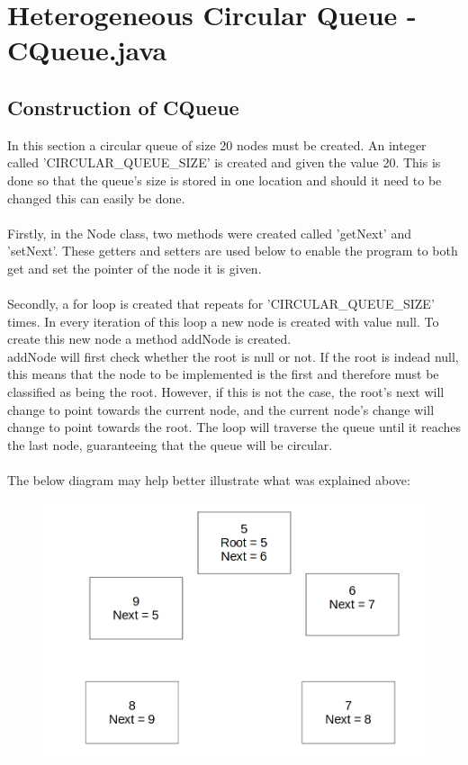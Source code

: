 \documentclass[a4paper]{article}
\begin{document}
\section{Heterogeneous Circular Queue - CQueue.java}

\subsection{Construction of CQueue}
In this section a circular queue of size 20 nodes must be created. An integer called 'CIRCULAR\_QUEUE\_SIZE' is created and given the value 20. This is done so that the queue's size is stored in one location and should it need to be changed this can easily be done. \\
\\Firstly, in the Node class, two methods were created called 'getNext' and 'setNext'. These getters and setters are used below to enable the program to both get and set the pointer of the node it is given.\\
\\Secondly, a for loop is created that repeats for 'CIRCULAR\_QUEUE\_SIZE' times. In every iteration of this loop a new node is created with value null. To create this new node a method addNode is created.\\
addNode will first check whether the root is null or not. If the root is indead null, this means that the node to be implemented is the first and therefore must be classified as being the root. However, if this is not the case, the root's next will change to point towards the current node, and the current node's change will change to point towards the root. The loop will traverse the queue until it reaches the last node, guaranteeing that the queue will be circular.\\
\\The below diagram may help better illustrate what was explained above:
\begin{figure}[htp]
\centering
\includegraphics[scale=0.30]{Images/Insert.png}
\end{figure}
\bigskip
\end{document}
